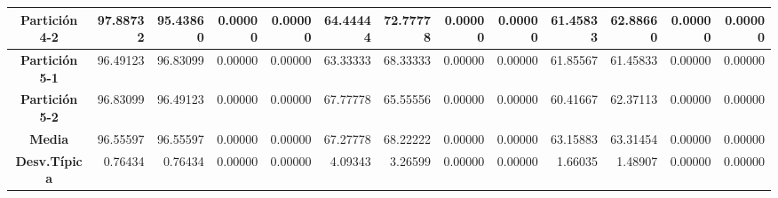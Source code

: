 \documentclass[a4paper,11pt]{article}
\begin{document}
\begin{table}[H]
\begin{adjustbox}{width=1.1\textwidth}
\begin{tabular}{|c|r|r|r|r|r|r|r|r|r|r|r|r|}
  \textbf{Partición 4-2} & 97.88732 & 95.43860 & 0.00000 & 0.00000 & 64.44444 & 72.77778 & 0.00000 & 0.00000 & 61.45833 & 62.88660 & 0.00000 & 0.00000 \\ \hline
  \textbf{Partición 5-1} & 96.49123 & 96.83099 & 0.00000 & 0.00000 & 63.33333 & 68.33333 & 0.00000 & 0.00000 & 61.85567 & 61.45833 & 0.00000 & 0.00000 \\ \hline
  \textbf{Partición 5-2} & 96.83099 & 96.49123 & 0.00000 & 0.00000 & 67.77778 & 65.55556 & 0.00000 & 0.00000 & 60.41667 & 62.37113 & 0.00000 & 0.00000 \\ \hline
  \textbf{Media} & 96.55597 & 96.55597 & 0.00000 & 0.00000 & 67.27778 & 68.22222 & 0.00000 & 0.00000 & 63.15883 & 63.31454 & 0.00000 & 0.00000 \\ \hline
  \textbf{Desv.Típica} & 0.76434 & 0.76434 & 0.00000 & 0.00000 & 4.09343 & 3.26599 & 0.00000 & 0.00000 & 1.66035 & 1.48907 & 0.00000 & 0.00000 \\ \hline
  \end{tabular}
  \end{adjustbox}
  \label{NN3}
  \end{table}
  
\end{document}
